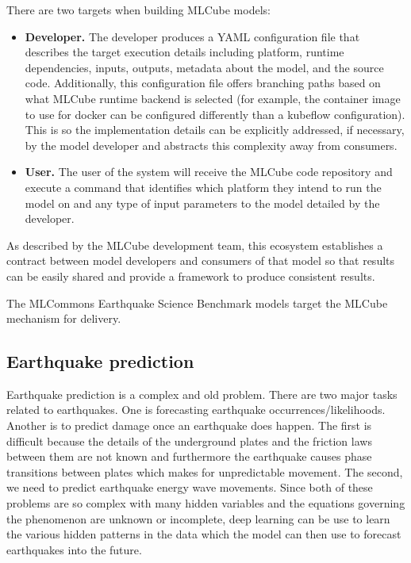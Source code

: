 \documentclass[sigplan,screen]{acmart}
\providecommand{\mlcube}{MLCube}
\begin{document}
There are two targets when building \mlcube{} models:

\begin{itemize}
    \item \textbf{Developer.}  The developer produces a YAML configuration file that describes the target execution details including platform, runtime dependencies, inputs, outputs, metadata about the model, and the source code.  Additionally, this configuration file offers branching paths based on what \mlcube{} runtime backend is selected (for example, the container image to use for docker can be configured differently than a kubeflow configuration).  This is so the implementation details can be explicitly addressed, if necessary, by the model developer and abstracts this complexity away from consumers.
    \item \textbf{User.}  The user of the system will receive the \mlcube{} code repository and execute a command that identifies which platform they intend to run the model on and any type of input parameters to the model detailed by the developer.
\end{itemize}

As described by the \mlcube{} development team, this ecosystem establishes a contract between model developers and consumers of that model so that results can be easily shared and provide a framework to produce consistent results.

The MLCommons Earthquake Science Benchmark models target the \mlcube{} mechanism for delivery.

\subsection{Earthquake prediction}

Earthquake prediction is a complex and old problem. There are two major tasks related to earthquakes. One is forecasting earthquake occurrences/likelihoods. Another is to predict damage once an earthquake does happen. The first is difficult because the details of the underground plates and the friction laws between them are not known and furthermore the earthquake causes phase transitions between plates which makes for unpredictable movement. The second, we need to predict earthquake energy wave movements. Since both of these problems are so complex with many hidden variables and the equations governing the phenomenon are unknown or incomplete, deep learning can be use to learn the various hidden patterns in the data which the model can then use to forecast earthquakes into the future. \cite{fox2021earthquake}
\end{document}
